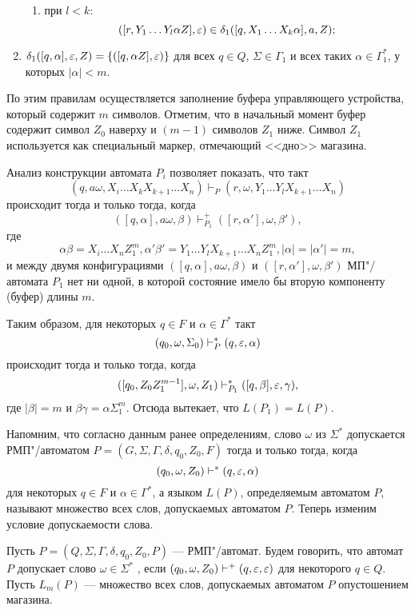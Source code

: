 \begin{myproof}
\begin{enumerate}
\begin{enumerate}
        \item при $l<k$:
        \[
        ([r,Y_1\ldots Y_l\alpha Z],\varepsilon) \in
            \delta_1([q,X_1\ldots X_k\alpha],a,Z);
        \]
    \end{enumerate}

    \item $\delta_1([q,\alpha],\varepsilon,Z)=\{([q,\alpha Z],\varepsilon)\}$ для
    всех $q\in Q$, $\Sigma\in\Gamma_1$ и всех таких
    $\alpha\in\Gamma_1^*$, у которых $|\alpha|<m$.

\end{enumerate}
По этим правилам осуществляется заполнение буфера управляющего устройства, который содержит $m$ символов. Отметим, что в начальный момент буфер содержит символ $Z_0$ наверху и $(m-1)$ символов $Z_1$ ниже. Символ $Z_1$ используется как специальный маркер, отмечающий <<дно>> магазина.

Анализ конструкции автомата $P_i$ позволяет показать, что такт
\[
    (q,a\omega,X_i\ldots X_kX_{k+1}\ldots X_n) \vdash_P
        (r,\omega,Y_1 \ldots Y_lX_{k+1} \ldots X_n)
\]
происходит тогда и только тогда, когда
\[
    ( [q,\alpha],a\omega,\beta ) \vdash_{P_1}^+
        ([r,\alpha'],\omega,\beta' ),
\]
где
\[
    \alpha\beta = X_i\ldots X_nZ_1^m, \alpha'\beta' =
        Y_1 \ldots Y_lX_{k+1} \ldots X_nZ_1^m, |\alpha| = |\alpha'| = m,
\]
и между двумя
конфигурациями $([q,\alpha],a\omega,\beta)$ и
$([r,\alpha'],\omega,\beta')$ МП"/автомата $P_1$ нет ни
одной, в которой состояние имело бы вторую компоненту (буфер) длины
$m$.

Таким образом, для некоторых $q\in F$ и $\alpha\in\Gamma^*$ такт
\[
(q_0,\omega,\Sigma_0) \vdash_P^* (q,\varepsilon,\alpha)
\]
происходит тогда и только тогда, когда
\[
([q_0,Z_0Z_1^{m-1}],\omega,Z_1) \vdash_{P_1}^*([q,\beta],\varepsilon,\gamma),
\]
где $|\beta|=m$ и $\beta\gamma=\alpha\Sigma_1^m$. Отсюда вытекает, что $L(P_1)=L(P)$.
\end{myproof}

Напомним, что согласно данным ранее определениям, слово $\omega$ из
$\Sigma^*$ допускается РМП"/автоматом $P=
(G,\Sigma,\Gamma,\delta,q_0,Z_0,F)$ тогда и только тогда, когда
\[
(q_0,\omega,Z_0)\vdash^*(q,\varepsilon,\alpha)
\]
для некоторых $q\in F$ и
$\alpha\in\Gamma^*$, а языком $L(P)$, определяемым автоматом $P$,
называют множество всех слов, допускаемых автоматом $P$. Теперь изменим условие допускаемости слова.

Пусть $P=(Q,\Sigma,\Gamma,\delta,q_0,Z_0,P)$ --- РМП"/автомат. Будем говорить, что автомат $P$ допускает слово $\omega\in\Sigma^*$ , если $(q_0,\omega,Z_0)\vdash^+(q,\varepsilon,\varepsilon)$ для некоторого $q\in Q$. Пусть $L_m(P)$ --- множество всех слов, допускаемых автоматом $P$ опустошением магазина.

